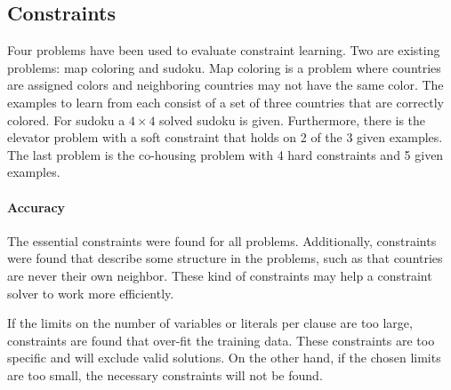 \documentclass[letterpaper]{article}
\theoremstyle{definition}
\begin{document}
\subsection{Constraints}
Four problems have been used to evaluate constraint learning.
Two are existing problems: map coloring and sudoku.
Map coloring is a problem where countries are assigned colors and neighboring countries may not have the same color.
The examples to learn from each consist of a set of three countries that are correctly colored.
For sudoku a $4 \times 4$ solved sudoku is given.
Furthermore, there is the elevator problem with a soft constraint that holds on 2 of the 3 given examples.
The last problem is the co-housing problem with 4 hard constraints and 5 given examples.

\paragraph{Accuracy}
The essential constraints were found for all problems.
Additionally, constraints were found that describe some structure in the problems, such as that countries are never their own neighbor.
These kind of constraints may help a constraint solver to work more efficiently.

If the limits on the number of variables or literals per clause are too large, constraints are found that over-fit the training data.
These constraints are too specific and will exclude valid solutions.
On the other hand, if the chosen limits are too small, the necessary constraints will not be found.
\end{document}
